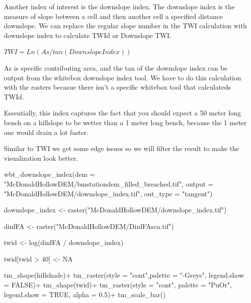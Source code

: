 \documentclass[
]{book}
\newenvironment{Shaded}{\begin{snugshade}}{\end{snugshade}}
\newcommand{\AttributeTok}[1]{\textcolor[rgb]{0.77,0.63,0.00}{#1}}
\newcommand{\ConstantTok}[1]{\textcolor[rgb]{0.00,0.00,0.00}{#1}}
\newcommand{\DecValTok}[1]{\textcolor[rgb]{0.00,0.00,0.81}{#1}}
\newcommand{\FloatTok}[1]{\textcolor[rgb]{0.00,0.00,0.81}{#1}}
\newcommand{\FunctionTok}[1]{\textcolor[rgb]{0.00,0.00,0.00}{#1}}
\newcommand{\NormalTok}[1]{#1}
\newcommand{\OtherTok}[1]{\textcolor[rgb]{0.56,0.35,0.01}{#1}}
\newcommand{\SpecialCharTok}[1]{\textcolor[rgb]{0.00,0.00,0.00}{#1}}
\newcommand{\StringTok}[1]{\textcolor[rgb]{0.31,0.60,0.02}{#1}}
\begin{document}
Another index of interest is the downslope index. The downslope index is the measure of slope between a cell and then another cell a specified distance downslope. We can replace the regular slope number in the TWI calculation with downslope index to calculate TWId or Downslope TWI.

\(TWI = Ln(As / tan(DownslopeIndex))\)

As is specific contributing area, and the tan of the downslope index can be output from the whitebox downslope index tool. We have to do this calculation with the rasters becasue there isn't a specific whitebox tool that calculateds TWId.

Essentially, this index captures the fact that you should expect a 50 meter long bench on a hillslope to be wetter than a 1 meter long bench, because the 1 meter one would drain a lot faster.

Similar to TWI we get some edge issues so we will filter the result to make the visualization look better.

\begin{Shaded}
\begin{Highlighting}[]
\FunctionTok{wbt\_downslope\_index}\NormalTok{(}\AttributeTok{dem =} \StringTok{"McDonaldHollowDEM/bmstationdem\_filled\_breached.tif"}\NormalTok{,}
                    \AttributeTok{output =} \StringTok{"McDonaldHollowDEM/downslope\_index.tif"}\NormalTok{,}
                    \AttributeTok{out\_type =} \StringTok{"tangent"}\NormalTok{)}

\NormalTok{downslope\_index }\OtherTok{\textless{}{-}} \FunctionTok{raster}\NormalTok{(}\StringTok{"McDonaldHollowDEM/downslope\_index.tif"}\NormalTok{)}

\NormalTok{dinfFA }\OtherTok{\textless{}{-}} \FunctionTok{raster}\NormalTok{(}\StringTok{"McDonaldHollowDEM/DinfFAsca.tif"}\NormalTok{)}

\NormalTok{twid }\OtherTok{\textless{}{-}} \FunctionTok{log}\NormalTok{(dinfFA }\SpecialCharTok{/}\NormalTok{ downslope\_index)}

\NormalTok{twid[twid }\SpecialCharTok{\textgreater{}} \DecValTok{40}\NormalTok{] }\OtherTok{\textless{}{-}} \ConstantTok{NA}

\FunctionTok{tm\_shape}\NormalTok{(hillshade)}\SpecialCharTok{+}
  \FunctionTok{tm\_raster}\NormalTok{(}\AttributeTok{style =} \StringTok{"cont"}\NormalTok{,}\AttributeTok{palette =} \StringTok{"{-}Greys"}\NormalTok{, }\AttributeTok{legend.show =} \ConstantTok{FALSE}\NormalTok{)}\SpecialCharTok{+}
\FunctionTok{tm\_shape}\NormalTok{(twid)}\SpecialCharTok{+}
  \FunctionTok{tm\_raster}\NormalTok{(}\AttributeTok{style =} \StringTok{"cont"}\NormalTok{, }\AttributeTok{palette =} \StringTok{"PuOr"}\NormalTok{, }\AttributeTok{legend.show =} \ConstantTok{TRUE}\NormalTok{, }\AttributeTok{alpha =} \FloatTok{0.5}\NormalTok{)}\SpecialCharTok{+}
  \FunctionTok{tm\_scale\_bar}\NormalTok{()}
\end{Highlighting}
\end{Shaded}
\end{document}
